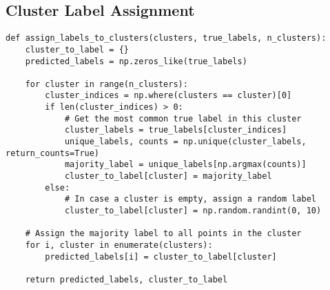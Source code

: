 \documentclass[12pt]{article}
\begin{document}
\subsection{Cluster Label Assignment}
\begin{lstlisting}
def assign_labels_to_clusters(clusters, true_labels, n_clusters):
    cluster_to_label = {}
    predicted_labels = np.zeros_like(true_labels)
    
    for cluster in range(n_clusters):
        cluster_indices = np.where(clusters == cluster)[0]
        if len(cluster_indices) > 0:
            # Get the most common true label in this cluster
            cluster_labels = true_labels[cluster_indices]
            unique_labels, counts = np.unique(cluster_labels, return_counts=True)
            majority_label = unique_labels[np.argmax(counts)]
            cluster_to_label[cluster] = majority_label
        else:
            # In case a cluster is empty, assign a random label
            cluster_to_label[cluster] = np.random.randint(0, 10)
    
    # Assign the majority label to all points in the cluster
    for i, cluster in enumerate(clusters):
        predicted_labels[i] = cluster_to_label[cluster]
    
    return predicted_labels, cluster_to_label
\end{lstlisting}
\end{document}
